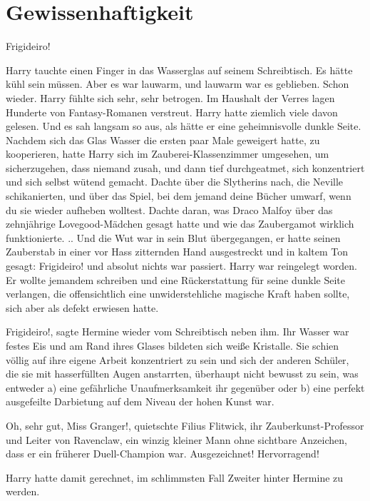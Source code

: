 \chapter{Gewissenhaftigkeit}

\loq Frigideiro!\grqq{}

Harry tauchte einen Finger in das Wasserglas auf seinem Schreibtisch. Es hätte
kühl sein müssen. Aber es war lauwarm, und lauwarm war es geblieben. Schon
wieder. Harry fühlte sich sehr, sehr betrogen. Im Haushalt der Verres lagen
Hunderte von Fantasy-Romanen verstreut. Harry hatte ziemlich viele davon
gelesen. Und es sah langsam so aus, als hätte er eine geheimnisvolle dunkle
Seite. Nachdem sich das Glas Wasser die ersten paar Male geweigert hatte, zu
kooperieren, hatte Harry sich im Zauberei-Klassenzimmer umgesehen, um
sicherzugehen, dass niemand zusah, und dann tief durchgeatmet, sich konzentriert
und sich selbst wütend gemacht. Dachte über die Slytherins nach, die Neville
schikanierten, und über das Spiel, bei dem jemand deine Bücher umwarf, wenn du
sie wieder aufheben wolltest. Dachte daran, was Draco Malfoy über das
zehnjährige Lovegood-Mädchen gesagt hatte und wie das Zaubergamot wirklich
funktionierte. .. Und die Wut war in sein Blut übergegangen, er hatte seinen
Zauberstab in einer vor Hass zitternden Hand ausgestreckt und in kaltem Ton
gesagt: \glqq{}Frigideiro!\grqq{} und absolut nichts war passiert. Harry war
reingelegt worden. Er wollte jemandem schreiben und eine Rückerstattung für
seine dunkle Seite verlangen, die offensichtlich eine unwiderstehliche magische
Kraft haben sollte, sich aber als defekt erwiesen hatte.

\glqq{}Frigideiro!\grqq{}, sagte Hermine wieder vom Schreibtisch neben ihm. Ihr
Wasser war festes Eis und am Rand ihres Glases bildeten sich weiße Kristalle.
Sie schien völlig auf ihre eigene Arbeit konzentriert zu sein und sich der
anderen Schüler, die sie mit hasserfüllten Augen anstarrten, überhaupt nicht
bewusst zu sein, was entweder a) eine gefährliche Unaufmerksamkeit ihr gegenüber
oder b) eine perfekt ausgefeilte Darbietung auf dem Niveau der hohen Kunst war.

\glqq{}Oh, sehr gut, Miss Granger!\grqq{}, quietschte Filius Flitwick, ihr
Zauberkunst-Professor und Leiter von Ravenclaw, ein winzig kleiner Mann ohne
sichtbare Anzeichen, dass er ein früherer Duell-Champion war. \glqq{}
Ausgezeichnet! Hervorragend!\grqq{}

Harry hatte damit gerechnet, im schlimmsten Fall Zweiter hinter Hermine zu
werden.

